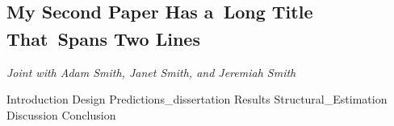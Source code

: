 \documentclass[11pt, a4paper, twoside]{book}
\begin{document}
\begin{refsection}
\begin{refcontext}[sorting=nyt]
	\printbibliography[heading=subbibliography]
\end{refcontext}

\end{refsection}




\renewcommand{\currentchapter}{Ch2}

\begin{refsection}

\makeatletter
\renewcommand{\@makefntext}[1]{\@makefntextorig{#1}}
\makeatother
\chapter
	[My Second Paper Has a~Long Title That\nolinebreak\  Spans Two Lines]
	{My Second Paper Has a\nolinebreak\ Long Title That\nolinebreak\ Spans Two Lines%
	 \setcounter{footnote}{1}\textsuperscript{\Large{}}%
	}
\label{diss:MySecondPaper}
\renewcommand{\thefootnote}{\fnsymbol{footnote}}
\footnotetext[1]{\:\protect}
\renewcommand{\thefootnote}{\thefootnoteorig}
\makeatletter
\renewcommand{\@makefntext}[1]{\@makefntextcustom{#1}}
\makeatother
\setcounter{footnote}{0}
\textsf{\Large\textit{Joint with Adam Smith, Janet Smith, and Jeremiah Smith}}

\begin{abstract}
	
\end{abstract}

\clearpage

\graphicspath{{1_Example_Content/}}
{Introduction}
{Design}
{Predictions_dissertation}
{Results}
{Structural_Estimation}
{Discussion}
{Conclusion}


\end{refsection}
\end{document}
